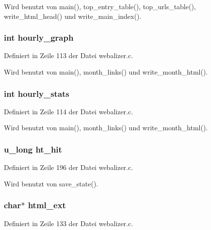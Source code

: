 Wird benutzt von main(), top\_\-entry\_\-table(), top\_\-urls\_\-table(), write\_\-html\_\-head() und write\_\-main\_\-index().
\subsubsection{\setlength{\rightskip}{0pt plus 5cm}int {\bf hourly\_\-graph}}\label{webalizer_8h_ef88d69bc7f6d6214835f0f15ef4522a}




Definiert in Zeile 113 der Datei webalizer.c.

Wird benutzt von main(), month\_\-links() und write\_\-month\_\-html().
\subsubsection{\setlength{\rightskip}{0pt plus 5cm}int {\bf hourly\_\-stats}}\label{webalizer_8h_6359837576bb8bf34e8b6984cee1e53a}




Definiert in Zeile 114 der Datei webalizer.c.

Wird benutzt von main(), month\_\-links() und write\_\-month\_\-html().
\subsubsection{\setlength{\rightskip}{0pt plus 5cm}u\_\-long {\bf ht\_\-hit}}\label{webalizer_8h_14a295f77051b0898135267236453dd6}




Definiert in Zeile 196 der Datei webalizer.c.

Wird benutzt von save\_\-state().
\subsubsection{\setlength{\rightskip}{0pt plus 5cm}char$\ast$ {\bf html\_\-ext}}\label{webalizer_8h_ef5a49b05e1bff557f85797e61dcd23a}




Definiert in Zeile 133 der Datei webalizer.c.

